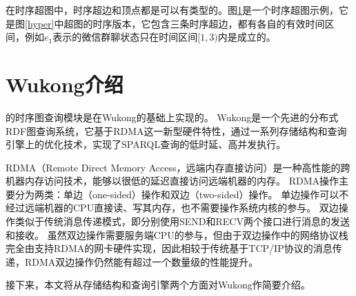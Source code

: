 在时序超图中，时序超边和顶点都是可以有类型的。图\ref{thyper}是一个时序超图示例，它是图\ref{hyper}中超图的时序版本，它包含三条时序超边，都有各自的有效时间区间，例如$e_1$表示的微信群聊状态只在时间区间$[1,3)$内是成立的。

\begin{figure}[htb] 
\label{thyper}
\end{figure}

\section{Wukong介绍}
\sys 的时序图查询模块是在Wukong的基础上实现的。
Wukong是一个先进的分布式RDF图查询系统，它基于RDMA这一新型硬件特性，通过一系列存储结构和查询引擎上的优化技术，实现了SPARQL查询的低时延、高并发执行。

RDMA（Remote Direct Memory Access，远端内存直接访问）是一种高性能的跨机器内存访问技术，能够以很低的延迟直接访问远端机器的内存。
RDMA操作主要分为两类：单边（one-sided）操作和双边（two-sided）操作。
单边操作可以不经过远端机器的CPU直接读、写其内存，也不需要操作系统内核的参与。
双边操作类似于传统消息传递模式，即分别使用SEND和RECV两个接口进行消息的发送和接收。
虽然双边操作需要服务端CPU的参与，但由于双边操作中的网络协议栈完全由支持RDMA的网卡硬件实现，因此相较于传统基于TCP/IP协议的消息传递，RDMA双边操作仍然能有超过一个数量级的性能提升。

接下来，本文将从存储结构和查询引擎两个方面对Wukong作简要介绍。

\begin{figure}[htb]
\label{kvstore}
\end{figure}

